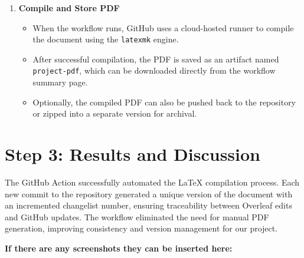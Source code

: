 \begin{enumerate}
    \item \textbf{Compile and Store PDF}
    \begin{itemize}
        \item When the workflow runs, GitHub uses a cloud-hosted runner to compile the document using the \texttt{latexmk} engine.
        \item After successful compilation, the PDF is saved as an artifact named \texttt{project-pdf}, which can be downloaded directly from the workflow summary page.
        \item Optionally, the compiled PDF can also be pushed back to the repository or zipped into a separate version for archival.
    \end{itemize}
\end{enumerate}

\section{Step 3: Results and Discussion}

The GitHub Action successfully automated the LaTeX compilation process. Each new commit to the repository generated a unique version of the document with an incremented changelist number, ensuring traceability between Overleaf edits and GitHub updates. The workflow eliminated the need for manual PDF generation, improving consistency and version management for our project. 


\textbf{If there are any screenshots they can be inserted here: }

